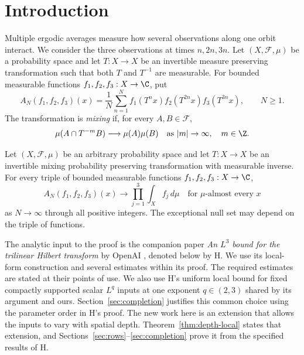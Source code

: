 \section{Introduction}\label{sec:introduction}

Multiple ergodic averages measure how several observations along one orbit
interact.  We consider the three observations at times $n,2n,3n$.  Let
$(X,\mathcal F,\mu)$ be a probability space and let $T:X\to X$ be an
invertible measure preserving transformation such that both $T$ and $T^{-1}$
are measurable.  For bounded measurable functions $f_1,f_2,f_3:X\to\C$, put
\begin{equation}
 A_N(f_1,f_2,f_3)(x)
 =\frac1N\sum_{n=1}^N
       f_1(T^n x)f_2(T^{2n}x)f_3(T^{3n}x),\qquad N\ge1.
 \label{eq:main-average}
\end{equation}
The transformation is \emph{mixing} if, for every $A,B\in\mathcal F$,
\begin{equation}
 \mu(A\cap T^{-m}B)\longrightarrow\mu(A)\mu(B)
 \quad\text{as }|m|\to\infty,\quad m\in\Z.
 \label{eq:mixing}
\end{equation}

\begin{theorem}\label{thm:main}
Let $(X,\mathcal F,\mu)$ be an arbitrary probability space and let
$T:X\to X$ be an invertible mixing probability preserving transformation
with measurable inverse.  For every triple of bounded measurable functions
$f_1,f_2,f_3:X\to\C$,
\[
 A_N(f_1,f_2,f_3)(x)
 \longrightarrow \prod_{j=1}^3\int_X f_j\,d\mu
 \quad\text{for $\mu$-almost every }x
\]
as $N\to\infty$ through all positive integers.  The exceptional null set
may depend on the triple of functions.
\end{theorem}

The analytic input to the proof is the companion paper
\emph{An $L^3$ bound for the trilinear Hilbert transform} by OpenAI
\cite{H}, denoted below by H.  We use its local-form construction and
several estimates within its proof.  The required estimates are stated at
their points of use.  We also use H's uniform local bound for fixed compactly supported
scalar $L^q$ inputs at one exponent $q\in(2,3)$ shared by its argument and ours.
Section~\ref{sec:completion} justifies this common choice using the
parameter order in H's proof.  The new work here is an extension that allows
the inputs to vary with spatial depth.  Theorem~\ref{thm:depth-local} states
that extension, and
Sections~\ref{sec:rows}--\ref{sec:completion} prove it from the specified
results of H.

